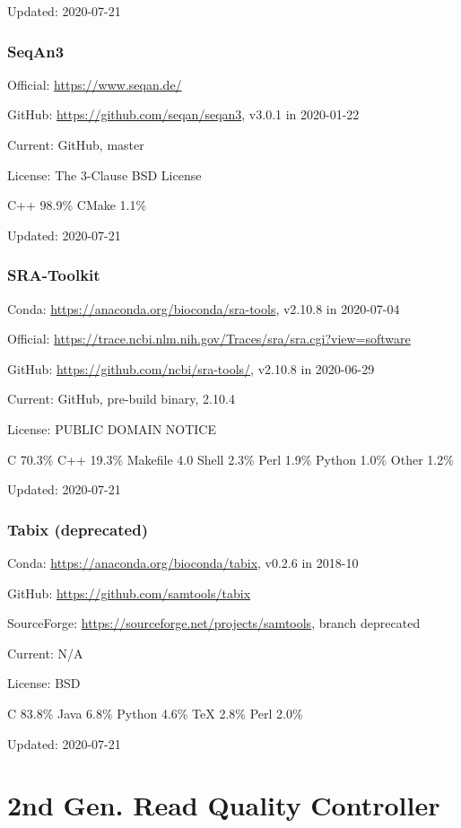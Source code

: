\documentclass[]{article}
\begin{document}
Updated: 2020-07-21

\section{SeqAn3}

Official: \url{https://www.seqan.de/}

GitHub: \url{https://github.com/seqan/seqan3}, v3.0.1 in 2020-01-22

Current: GitHub, master

License: The 3-Clause BSD License

C++ 98.9\% CMake 1.1\%

Updated: 2020-07-21

\section{SRA-Toolkit}

Conda: \url{https://anaconda.org/bioconda/sra-tools}, v2.10.8 in 2020-07-04

Official: \url{https://trace.ncbi.nlm.nih.gov/Traces/sra/sra.cgi?view=software}

GitHub: \url{https://github.com/ncbi/sra-tools/}, v2.10.8 in 2020-06-29

Current: GitHub, pre-build binary, 2.10.4

License: PUBLIC DOMAIN NOTICE

C 70.3\% C++ 19.3\% Makefile 4.0 Shell 2.3\% Perl 1.9\% Python 1.0\% Other 1.2\%

Updated: 2020-07-21

\section{Tabix (deprecated)}

Conda: \url{https://anaconda.org/bioconda/tabix}, v0.2.6 in 2018-10

GitHub: \url{https://github.com/samtools/tabix}

SourceForge: \url{https://sourceforge.net/projects/samtools}, branch deprecated

Current: N/A

License: BSD

C 83.8\% Java 6.8\% Python 4.6\% TeX 2.8\% Perl 2.0\%

Updated: 2020-07-21

\part{2nd Gen. Read Quality Controller}
\end{document}

